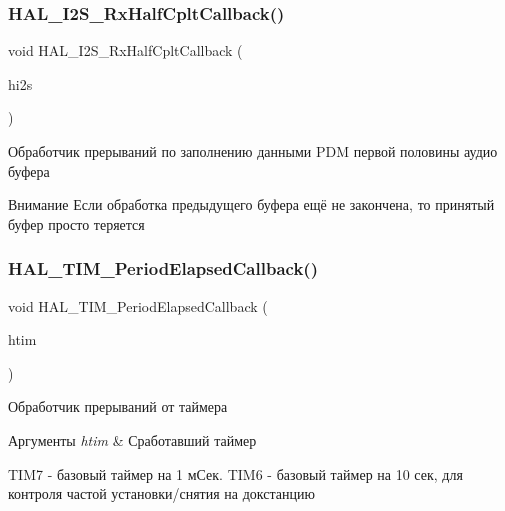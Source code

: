 \subsubsection{\texorpdfstring{H\+A\+L\+\_\+\+I2\+S\+\_\+\+Rx\+Half\+Cplt\+Callback()}{HAL\_I2S\_RxHalfCpltCallback()}}
{\footnotesize\ttfamily void H\+A\+L\+\_\+\+I2\+S\+\_\+\+Rx\+Half\+Cplt\+Callback (\begin{DoxyParamCaption}\item[{I2\+S\+\_\+\+Handle\+Type\+Def $\ast$}]{hi2s }\end{DoxyParamCaption})}



Обработчик прерываний по заполнению данными P\+DM первой половины аудио буфера 



 \begin{DoxyAttention}{Внимание}
Если обработка предыдущего буфера ещё не закончена, то принятый буфер просто теряется 
\end{DoxyAttention}
\mbox{\label{group___callback_ga8a3b0ad512a6e6c6157440b68d395eac}} 
\subsubsection{\texorpdfstring{H\+A\+L\+\_\+\+T\+I\+M\+\_\+\+Period\+Elapsed\+Callback()}{HAL\_TIM\_PeriodElapsedCallback()}}
{\footnotesize\ttfamily void H\+A\+L\+\_\+\+T\+I\+M\+\_\+\+Period\+Elapsed\+Callback (\begin{DoxyParamCaption}\item[{T\+I\+M\+\_\+\+Handle\+Type\+Def $\ast$}]{htim }\end{DoxyParamCaption})}



Обработчик прерываний от таймера 


\begin{DoxyParams}{Аргументы}
{\em htim} & Сработавший таймер\\
\hline
\end{DoxyParams}
T\+I\+M7 -\/ базовый таймер на 1 мСек. T\+I\+M6 -\/ базовый таймер на 10 сек, для контроля частой установки/снятия на докстанцию \mbox{\label{group___callback_gabcdf9b59049eccbc87d54042f9235b1a}} 
